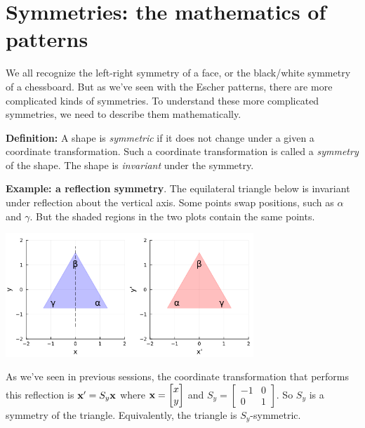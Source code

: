 \documentclass[letter]{article}
\newcommand{\bx}{{\bf x}}
\newcommand{\Sy}{S_y}
\begin{document}
\section{Symmetries: the mathematics of patterns}

We all recognize the left-right symmetry of a face, or the black/white symmetry of a chessboard.
But as we've seen with the Escher patterns, there are more complicated kinds of symmetries.
To understand these more complicated symmetries, we need to describe them mathematically. 

\vspace{2mm}
{\bf Definition:} A shape is {\em symmetric} if it does not change under
a given a coordinate transformation. Such a coordinate transformation is called a
{\em symmetry} of the shape. The shape is {\em invariant} under the symmetry.

\vspace{2mm}
{\bf Example: a reflection symmetry}. The equilateral triangle below is invariant under
reflection about the vertical axis. Some points swap positions, such as $\alpha$ and $\gamma$.
But the shaded regions in the two plots contain the same points. 
\begin{center}
\includegraphics[width=0.7\textwidth]{triangle-sx-symmetry.png}
\end{center}
As we've seen in previous sessions, the coordinate transformation that performs this reflection
is $\bx' = \Sy \bx$ where $\bx = \begin{bmatrix} x \\ y \end{bmatrix}$ and
$\Sy = \begin{bmatrix} -1 & 0 \\ 0 & 1 \end{bmatrix}$. So $\Sy$ is a symmetry of the triangle.
Equivalently, the triangle is $\Sy$-symmetric.
\end{document}
